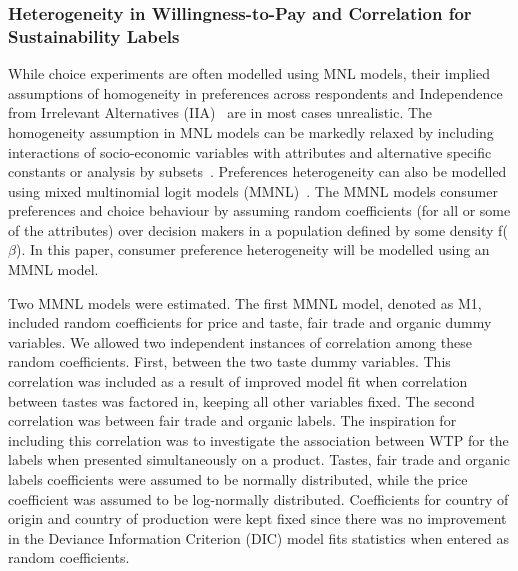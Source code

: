 \documentclass[sustainability,article,accept,moreauthors,pdftex,10pt,a4paper]{Definitions/mdpi}
\theoremstyle{mdpi}
\newcounter{ex}
\newcounter{re}
\theoremstyle{mdpidefinition}
\begin{document}
{\subsubsection{Heterogeneity in Willingness-to-Pay and Correlation for Sustainability Labels} %
\par{While choice experiments are often modelled using MNL models, their implied assumptions of homogeneity in preferences across respondents and Independence from Irrelevant Alternatives (IIA)~\cite{Train2009} are in most cases unrealistic. The homogeneity assumption in MNL models can be markedly relaxed by including interactions of socio-economic variables with attributes and alternative specific constants  or analysis by subsets~\cite{Ryan2008,Rousseau2015}. Preferences heterogeneity can also be modelled using mixed multinomial logit models (MMNL)~\cite{mcfadden2000mixed,Train2009}\iffalse, of which special cases~\cite{mcfadden1986} exist\fi. The MMNL models consumer preferences and choice behaviour by assuming random coefficients (for all or some of the attributes) over decision makers in a population defined by some density f($\beta$). In this paper, consumer preference heterogeneity will be modelled using an MMNL model.
}
\par{Two MMNL models were estimated. The first MMNL model, denoted as M1, included random coefficients for price and taste, fair trade and organic dummy variables. We allowed two independent instances of correlation among these random coefficients. First, between the two taste dummy variables. This correlation was included as a result of improved model fit when correlation between tastes was factored in, keeping all other variables fixed. The second correlation was between fair trade and organic labels. The inspiration for including this correlation was to investigate the association between WTP for the labels when presented simultaneously on a product. Tastes, fair trade and organic labels coefficients were assumed to be normally distributed, while the price coefficient was assumed to be log-normally distributed. Coefficients for country of origin and country of production were kept fixed since there was no improvement in the Deviance Information Criterion (DIC) model fits statistics when entered as random coefficients.}

}
\end{document}
